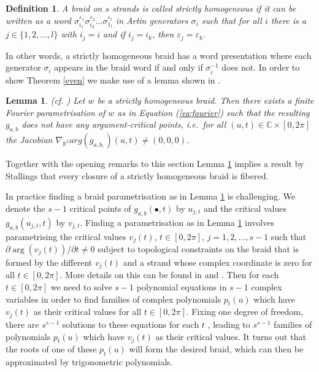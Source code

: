 \documentclass[notitlepage,12pt]{revtex4-1}
\newtheorem{lemma}[theorem]{\bf Lemma}
\newtheorem{definition}[theorem]{\bf Definition}
\begin{document}
\begin{definition}A braid on $s$ strands is called \textit{strictly homogeneous} if it can be written as a word $\sigma_{i_{1}}^{\varepsilon_{1}}\sigma_{i_{2}}^{\varepsilon_{2}}\ldots\sigma_{1_{l}}^{\varepsilon_{l}}$ in Artin generators $\sigma_{i}$ such that for all $i$ there is a $j\in\{1,2,\ldots,l\}$ with $i_{j}=i$ and if $i_{j}=i_{k}$, then $\varepsilon_{j}=\varepsilon_{k}$.
\end{definition}  

In other words, a strictly homogeneous braid has a word presentation where each generator $\sigma_{i}$ appears in the braid word if and only if $\sigma_{i}^{-1}$ does not. 
In order to show Theorem \ref{even} we make use of a lemma shown in \cite{bode:2016polynomial}.

\begin{lemma}
\label{crit}
(cf. \cite{bode:2016polynomial})
Let $w$ be a strictly homogeneous braid. Then there exists a finite Fourier parametrisation of $w$ as in Equation (\ref{eq:fourier}) such that the resulting $g_{a,b}$ does not have any argument-critical points, i.e.\ for all $(u,t)\in\mathbb{C}\times[0,2\pi]$ the Jacobian $\nabla_{\mathbb{R}^{3}}arg(g_{a,b,})(u,t)\neq (0,0,0)$.
\end{lemma}

Together with the opening remarks to this section Lemma \ref{crit} implies a result by Stallings \cite{stallings:1978constructions} that every closure of a strictly homogeneous braid is fibered.

In practice finding a braid parametrisation as in Lemma \ref{crit} is challenging. We denote the $s-1$ critical points of $g_{a,b}(\bullet, t)$ by $u_{j,t}$ and the critical values $g_{a,b}(u_{j,t},t)$ by $v_{j,t}$. Finding a parametrisation as in Lemma \ref{crit} involves parametrising the critical values $v_{j}(t)$, $t\in[0,2\pi]$, $j=1,2,\ldots,s-1$ such that $\partial\arg(v_{j}(t))/\partial t\neq 0$ subject to topological constraints on the braid that is formed by the different $v_{j}(t)$ and a strand whose complex coordinate is zero for all $t\in[0,2\pi]$. More details on this can be found in \cite{bode:2016polynomial} and \cite{rudolph:2001some}. Then for each $t\in[0,2\pi]$ we need to solve $s-1$ polynomial equations in $s-1$ complex variables in order to find families of complex polynomials $p_{t}(u)$ which have $v_{j}(t)$ as their critical values for all $t\in[0,2\pi]$. Fixing one degree of freedom, there are $s^{s-1}$ solutions to these equations for each $t$ \cite{bcn:2002critical}, leading to $s^{s-1}$ families of polynomials $p_{t}(u)$ which have $v_{j}(t)$ as their critical values. It turns out that the roots of one of these $p_{t}(u)$ will form the desired braid, which can then be approximated by trigonometric polynomials.
\end{document}

